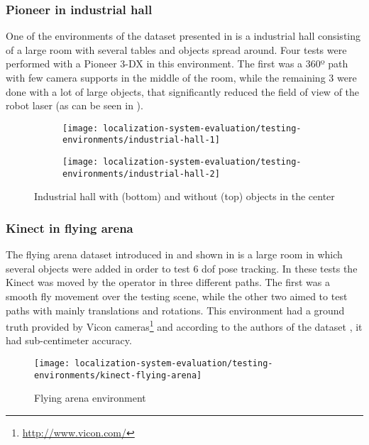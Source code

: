 \subsubsection{Pioneer in industrial hall}

One of the environments of the dataset presented in \cite{Sturm2012} is a industrial hall consisting of a large room with several tables and objects spread around. Four tests were performed with a Pioneer 3-DX in this environment. The first was a 360º path with few camera supports in the middle of the room, while the remaining 3 were done with a lot of large objects, that significantly reduced the field of view of the robot laser (as can be seen in ).

\begin{figure}[ht]
	\centering
	\begin{subfigure}[ht]{0.47\textwidth}
		\centering
		\texttt{[image: localization-system-evaluation/testing-environments/industrial-hall-1]}
	\end{subfigure}
	\begin{subfigure}[ht]{0.47\textwidth}
		\centering
		\texttt{[image: localization-system-evaluation/testing-environments/industrial-hall-2]}
	\end{subfigure}
	\caption{Industrial hall with (bottom) and without (top) objects in the center \cite{Sturm2012}}
	\label{fig:localization-system-evaluation_industrial-hall}
\end{figure}



\subsubsection{Kinect in flying arena}

The flying arena dataset introduced in \cite{Pomerleau2011} and shown in  is a large room in which several objects were added in order to test 6 \gls{dof} pose tracking. In these tests the Kinect was moved by the operator in three different paths. The first was a smooth fly movement over the testing scene, while the other two aimed to test paths with mainly translations and rotations. This environment had a ground truth provided by Vicon cameras\footnote{\url{http://www.vicon.com/}} and according to the authors of the dataset \cite{Pomerleau2011}, it had sub-centimeter accuracy.

\begin{figure}[H]
	\centering
	\texttt{[image: localization-system-evaluation/testing-environments/kinect-flying-arena]}
	\caption{Flying arena environment \cite{Pomerleau2011}}
	\label{fig:localization-system-evaluation_flying-arena}
\end{figure}
